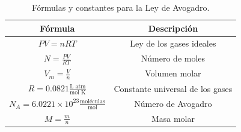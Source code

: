 \documentclass[../main]{subfiles}
\begin{document}
\begin{table}[h]
\centering
\begin{tabular}{|c|c|}
  \hline
  Fórmula & Descripción \\ \hline
  $PV = nRT$ & Ley de los gases ideales \\ \hline
  $N = \frac{P V}{R T}$ & Número de moles \\ \hline
  $V_m = \frac{V}{n}$ & Volumen molar \\ \hline
  $R = 0.0821 \frac{\textrm{L atm}}{\textrm{mol K}}$ & Constante
  universal de los gases \\ \hline
  $N_A = 6.0221 \times 10^{23}
  \frac{\textrm{moléculas}}{\textrm{mol}}$ & Número de Avogadro \\ \hline
  $M = \frac{m}{n}$ & Masa molar \\ \hline
\end{tabular}
\caption{Fórmulas y constantes para la Ley de Avogadro.}
\label{tabla:avogadro}
\end{table}
\end{document}
